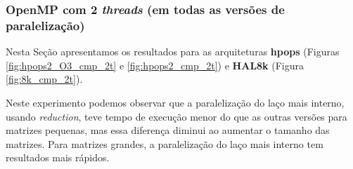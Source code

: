 \documentclass[a4paper, 12pt]{article}
\begin{document}
\subsubsection{OpenMP com 2 \textit{threads} (em todas as versões de paralelização)}

Nesta Seção apresentamos os resultados para as arquiteturas \textbf{hpops}
(Figuras \ref{fig:hpops2_O3_cmp_2t} e \ref{fig:hpops2_cmp_2t}) e \textbf{HAL8k}
(Figura \ref{fig:8k_cmp_2t}).

Neste experimento podemos observar que a paralelização do laço mais
interno, usando \textit{reduction}, teve tempo de execução menor
do que as outras versões para matrizes pequenas, mas essa diferença
diminui ao aumentar o tamanho das matrizes. Para matrizes grandes,
a paralelização do laço mais interno tem resultados mais rápidos.
\end{document}
